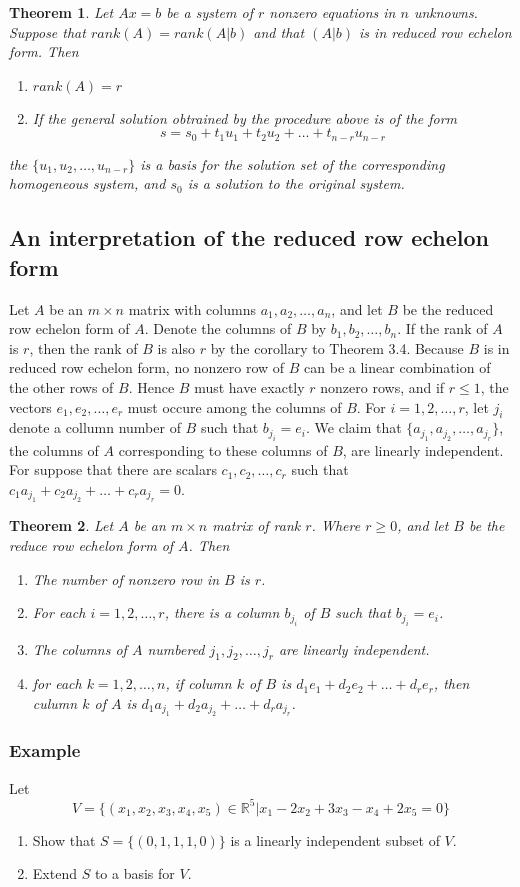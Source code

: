 \documentclass[10pt, oneside]{article}
\newcommand{\R}{\mathbb{R}}
\newtheorem{thm}{Theorem}
\begin{document}
\begin{thm}
	Let $Ax = b$ be a system of $r$ nonzero equations in $n$ unknowns. Suppose that $rank(A) = rank(A|b)$ and that $(A|b)$ is in reduced row echelon form. Then
	\begin{enumerate}
		\item $rank(A) = r$
		\item If the general solution obtrained by the procedure above is of the form
		      \[
			      s = s_0 + t_1 u_1 + t_2 u_2 + \ldots + t_{n-r} u_{n-r}
		      \]
	\end{enumerate}
	the $\{u_1, u_2, \ldots, u_{n-r}\}$ is a basis for the solution set of the corresponding homogeneous system, and $s_0$ is a solution to the original system.
\end{thm}

\subsection{An interpretation of the reduced row echelon form}

Let $A$ be an $m \times n$ matrix with columns $a_1, a_2, \ldots, a_n$, and let $B$ be the reduced row echelon form of $A$. Denote the columns of $B$ by $b_1, b_2, \ldots, b_n$. If the rank of $A$ is
$r$, then the rank of $B$ is also $r$ by the corollary to Theorem 3.4. Because $B$ is in reduced row echelon form, no nonzero row of $B$ can be a linear combination of the other rows of $B$. Hence $B$
must have exactly $r$ nonzero rows, and if $r \leq 1$, the vectors $e_1, e_2, \ldots, e_r$ must occure among the columns of $B$. For $i = 1, 2, \ldots, r$, let $j_i$ denote a collumn number of $B$ such
that $b_{j_i} = e_i$. We claim that $\{a_{j_1}, a_{j_2}, \ldots, a_{j_r}\}$, the columns of $A$ corresponding to these columns of $B$, are linearly independent. For suppose that there are scalars $c_1, c_2, \ldots, c_r$
such that $c_1a_{j_1} + c_2a_{j_2} + \ldots + c_ra_{j_r} = 0$.

\begin{thm}
	Let $A$ be an $m \times n$ matrix of rank $r$. Where $r \geq 0$, and let $B$ be the reduce row echelon form of $A$. Then
	\begin{enumerate}
		\item The number of nonzero row in $B$ is $r$.
		\item For each $i = 1, 2, \ldots, r$, there is a column $b_{j_i}$ of $B$ such that $b_{j_i} = e_i$.
		\item The columns of $A$ numbered $j_1, j_2, \ldots, j_r$ are linearly independent.
		\item for each $k = 1, 2, \ldots, n$, if column $k$ of $B$ is $d_1e_1 + d_2e_2 + \ldots + d_re_r$, then culumn $k$ of $A$ is $d_1a_{j_1} + d_2a_{j_2} + \ldots + d_ra_{j_r}$.
	\end{enumerate}
\end{thm}

\subsubsection{Example}
Let
\[
	V = \{ (x_1, x_2, x_3, x_4, x_5) \in \R^5 | x_1 - 2x_2 + 3x_3 - x_4 + 2x_5 = 0 \}
\]
\begin{enumerate}
	\item Show that $S = \{ (0,1,1,1,0) \}$ is a linearly independent subset of $V$.
	\item Extend $S$ to a basis for $V$.
\end{enumerate}
\end{document}
